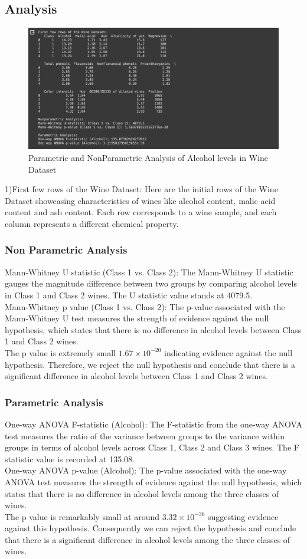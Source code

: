 \documentclass{article}
\begin{document}
\subsection{Analysis} 
\begin{figure}[ht]
    \centering
    \includegraphics[width=0.7\linewidth]{StatAnalysis.jpeg}
    \caption{Parametric and NonParametric Analysis of Alcohol levels in Wine Dataset}
    \label{fig:AnalysisResult}
\end{figure}
1)First few rows of the Wine Dataset:
Here are the initial rows of the Wine Dataset showcasing characteristics of wines like alcohol content, malic acid content and ash content. Each row corresponds to a wine sample, and each column represents a different chemical property.
\subsubsection {Non Parametric Analysis}
Mann-Whitney U statistic (Class 1 vs. Class 2): The Mann-Whitney U statistic gauges the magnitude difference between two groups by comparing alcohol levels in Class 1 and Class 2 wines. The U statistic value stands at 4079.5.
\\Mann-Whitney p value (Class 1 vs. Class 2): The p-value associated with the Mann-Whitney U test measures the strength of evidence against the null hypothesis, which states that there is no difference in alcohol levels between Class 1 and Class 2 wines. 
\\The p value is extremely small $1.67 \times 10^{-20}$ indicating evidence against the null hypothesis. Therefore, we reject the null hypothesis and conclude that there is a significant difference in alcohol levels between Class 1 and Class 2 wines.

\subsubsection {Parametric Analysis}
One-way ANOVA F-statistic (Alcohol): The F-statistic from the one-way ANOVA test measures the ratio of the variance between groups to the variance within groups in terms of alcohol levels across Class 1, Class 2 and Class 3 wines. The F statistic value is recorded at 135.08.
\\One-way ANOVA p-value (Alcohol): The p-value associated with the one-way ANOVA test measures the strength of evidence against the null hypothesis, which states that there is no difference in alcohol levels among the three classes of wines. 
\\The p value is remarkably small at around $3.32 \times 10^{-36}$ suggesting evidence against this hypothesis. Consequently we can reject the hypothesis and conclude that there is a significant difference in alcohol levels among the three classes of wines.
\end{document}
